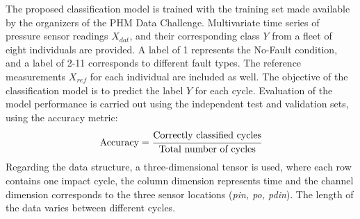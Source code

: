 The proposed classification model is trained with the training set made available by the organizers of the PHM Data Challenge.
Multivariate time series of pressure sensor readings $X_{dat}$, and their corresponding class $Y$ from a fleet of eight individuals are provided. A label of 1 represents the No-Fault condition, and a label of 2-11 corresponds to different fault types. 
The reference measurements $X_{ref}$ for each individual are included as well. 
The objective of the classification model is to predict the label $Y$ for each cycle.
Evaluation of the model performance is carried out using the independent test and validation sets, using the accuracy metric:
\begin{equation}\label{eq:phm_accuracy}
\text{Accuracy} = \cfrac{\text{Correctly classified cycles}}{\text{Total number of cycles}}
\end{equation}
Regarding the data structure, a three-dimensional tensor is used, %
where each row contains one impact cycle, the column dimension represents time and the channel dimension corresponds to the three sensor locations (\textit{pin, po, pdin}). The length of the data varies between different cycles.

